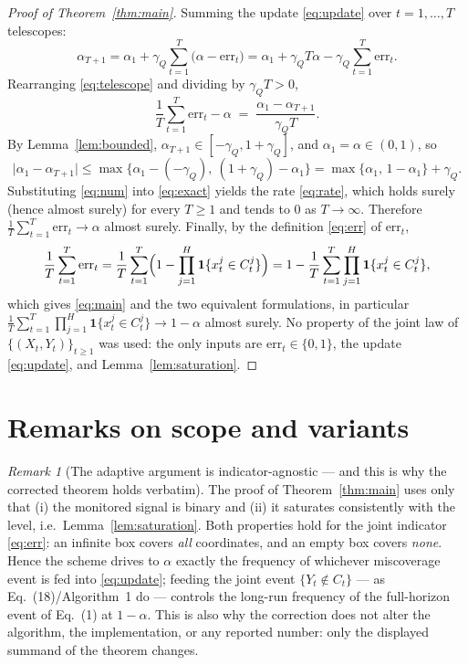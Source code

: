 \documentclass[11pt]{article}
\theoremstyle{definition}
\theoremstyle{remark}
\newtheorem{remark}[theorem]{Remark}
\newcommand{\ind}{\mathbf{1}}
\newcommand{\err}{\mathrm{err}}
\begin{document}
\begin{proof}[Proof of Theorem~\ref{thm:main}]
Summing the update \eqref{eq:update} over $t=1,\dots,T$ telescopes:
\begin{equation}
  \alpha_{T+1}
  =\alpha_1+\gamma_Q\sum_{t=1}^{T}\bigl(\alpha-\err_t\bigr)
  =\alpha_1+\gamma_Q T\alpha-\gamma_Q\sum_{t=1}^{T}\err_t .
  \label{eq:telescope}
\end{equation}
Rearranging \eqref{eq:telescope} and dividing by $\gamma_Q T>0$,
\begin{equation}
  \frac{1}{T}\sum_{t=1}^{T}\err_t-\alpha
  \;=\;\frac{\alpha_1-\alpha_{T+1}}{\gamma_Q T}.
  \label{eq:exact}
\end{equation}
By Lemma~\ref{lem:bounded}, $\alpha_{T+1}\in[-\gamma_Q,1+\gamma_Q]$, and
$\alpha_1=\alpha\in(0,1)$, so
\begin{equation}
  \lvert\alpha_1-\alpha_{T+1}\rvert
  \le\max\bigl\{\alpha_1-(-\gamma_Q),\ (1+\gamma_Q)-\alpha_1\bigr\}
  =\max\{\alpha_1,\,1-\alpha_1\}+\gamma_Q .
  \label{eq:num}
\end{equation}
Substituting \eqref{eq:num} into \eqref{eq:exact} yields the rate
\eqref{eq:rate}, which holds surely (hence almost surely) for every $T\ge1$ and
tends to $0$ as $T\to\infty$. Therefore
$\frac{1}{T}\sum_{t=1}^{T}\err_t\to\alpha$ almost surely. Finally, by the
definition \eqref{eq:err} of $\err_t$,
\[
  \frac{1}{T}\sum_{t=1}^{T}\err_t
  =\frac{1}{T}\sum_{t=1}^{T}
   \Bigl(1-\prod_{j=1}^{H}\ind\{x_t^{j}\in C_t^{j}\}\Bigr)
  =1-\frac{1}{T}\sum_{t=1}^{T}\prod_{j=1}^{H}\ind\{x_t^{j}\in C_t^{j}\},
\]
which gives \eqref{eq:main} and the two equivalent formulations, in particular
$\frac{1}{T}\sum_{t=1}^{T}\prod_{j=1}^{H}\ind\{x_t^{j}\in C_t^{j}\}\to1-\alpha$
almost surely. No property of the joint law of $\{(X_t,Y_t)\}_{t\ge1}$ was used:
the only inputs are $\err_t\in\{0,1\}$, the update \eqref{eq:update}, and
Lemma~\ref{lem:saturation}.
\end{proof}

\section{Remarks on scope and variants}
\label{sec:remarks}

\begin{remark}[The adaptive argument is indicator-agnostic --- and this is why
the corrected theorem holds verbatim]
\label{rem:agnostic}
The proof of Theorem~\ref{thm:main} uses only that (i) the monitored signal is
binary and (ii) it saturates consistently with the level, i.e.\
Lemma~\ref{lem:saturation}. Both properties hold for the joint indicator
\eqref{eq:err}: an infinite box covers \emph{all} coordinates, and an empty box
covers \emph{none}. Hence the scheme drives to $\alpha$ exactly the frequency of
whichever miscoverage event is fed into \eqref{eq:update}; feeding the joint
event $\{Y_t\notin C_t\}$ --- as Eq.~(18)/Algorithm~1 do --- controls the
long-run frequency of the full-horizon event of Eq.~(1) at $1-\alpha$. This is
also why the correction does not alter the algorithm, the implementation, or any
reported number: only the displayed summand of the theorem changes.
\end{remark}
\end{document}
